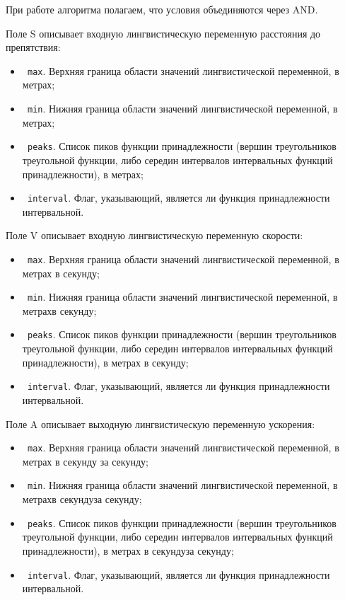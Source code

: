 При работе алгоритма полагаем, что условия объединяются через AND.

Поле S описывает входную лингвистическую переменную расстояния до препятствия:
\begin{itemize}
	\item \lstinline! max!. Верхняя граница области значений лингвистической переменной, в метрах;
	\item \lstinline! min!. Нижняя граница области значений лингвистической переменной, в метрах;
	\item \lstinline! peaks!. Список пиков функции принадлежности (вершин треугольников треугольной функции, либо середин интервалов интервальных функций принадлежности), в метрах;
	\item \lstinline! interval!. Флаг, указывающий, является ли функция принадлежности интервальной.
\end{itemize}

Поле V описывает входную лингвистическую переменную скорости:
\begin{itemize}
	\item \lstinline! max!. Верхняя граница области значений лингвистической переменной, в метрах в секунду;
	\item \lstinline! min!. Нижняя граница области значений лингвистической переменной, в метрахв секунду;
	\item \lstinline! peaks!. Список пиков функции принадлежности (вершин треугольников треугольной функции, либо середин интервалов интервальных функций принадлежности), в метрах в секунду;
	\item \lstinline! interval!. Флаг, указывающий, является ли функция принадлежности интервальной.
\end{itemize}

Поле A описывает выходную лингвистическую переменную ускорения:
\begin{itemize}
	\item \lstinline! max!. Верхняя граница области значений лингвистической переменной, в метрах в секунду за секунду;
	\item \lstinline! min!. Нижняя граница области значений лингвистической переменной, в метрахв секундуза секунду;
	\item \lstinline! peaks!. Список пиков функции принадлежности (вершин треугольников треугольной функции, либо середин интервалов интервальных функций принадлежности), в метрах в секундуза секунду;
	\item \lstinline! interval!. Флаг, указывающий, является ли функция принадлежности интервальной.
\end{itemize}

